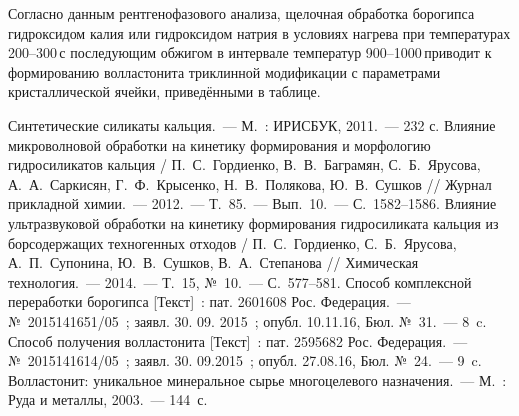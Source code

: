Согласно данным рентгенофазового анализа, щелочная обработка борогипса гидроксидом калия или гидроксидом натрия в условиях нагрева при температурах 200--300\,\dgc с последующим обжигом в интервале температур 900--1000\,\dgc приводит к формированию волластонита триклинной модификации с параметрами кристаллической ячейки, приведёнными в таблице.


\begin{thebibliography}{99}
\bibitem{} Синтетические силикаты кальция.~--- М.~: ИРИСБУК, 2011.~--- 232 с.
\bibitem{} Влияние микроволновой обработки на кинетику формирования и морфологию гидросиликатов кальция / П.~С.~Гордиенко, В.~В.~Баграмян, С.~Б.~Ярусова, А.~А.~Саркисян, Г.~Ф.~Крысенко, Н.~В.~Полякова, Ю.~В.~Сушков // Журнал прикладной химии.~--- 2012.~--- Т.~85.~--- Вып.~10.~--- С.~1582--1586.
\bibitem{} Влияние ультразвуковой обработки на кинетику формирования гидросиликата кальция из борсодержащих техногенных отходов / П.~С.~Гордиенко, С.~Б.~Ярусова, А.~П.~Супонина, Ю.~В.~Сушков, В.~А.~Степанова // Химическая технология.~--- 2014.~--- Т.~15, №~10.~--- С.~577--581.
\bibitem{}Способ комплексной переработки борогипса [Текст]~: пат. 2601608 Рос. Федерация.~--- №~2015141651/05~; заявл. 30. 09. 2015~; опубл. 10.11.16, Бюл. №~31.~--- 8~c.
\bibitem{}Способ получения волластонита [Текст]~: пат. 2595682 Рос. Федерация.~--- №~2015141614/05~; заявл. 30. 09.2015~; опубл. 27.08.16, Бюл. №~24.~--- 9~c.
\bibitem{} Волластонит: уникальное минеральное сырье многоцелевого назначения.~--- М.~: Руда и металлы, 2003.~--- 144~с.

\end{thebibliography}
